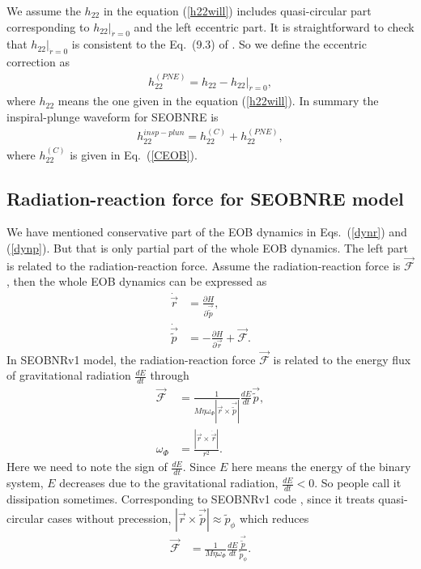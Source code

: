 \documentclass[prd,aps,a4paper,superscriptaddress,twocolumn,footinbib,showpacs]{revtex4}
\begin{document}
We assume the $h_{22}$ in the equation (\ref{h22will}) includes quasi-circular part corresponding to $h_{22}|_{\dot{r}=0}$ and the left eccentric part. It is straightforward to check that $h_{22}|_{\dot{r}=0}$ is consistent to the Eq.~(9.3) of \cite{Blanchet16}. So we define the eccentric correction as
\begin{align}
h_{22}^{(PNE)}=h_{22}-h_{22}|_{\dot{r}=0},\label{h22willelip}
\end{align}
where $h_{22}$ means the one given in the equation (\ref{h22will}). In summary the inspiral-plunge waveform for SEOBNRE is
\begin{align}
h_{22}^{insp-plun}=h_{22}^{(C)}+h_{22}^{(PNE)}, \label{Ewave}
\end{align}
where $h_{22}^{(C)}$ is given in Eq.~(\ref{CEOB}).

\subsection{Radiation-reaction force for SEOBNRE model}
We have mentioned conservative part of the EOB dynamics in Eqs.~(\ref{dynr}) and (\ref{dynp}). But that is only partial part of the whole EOB dynamics. The left part is related to the radiation-reaction force. Assume the radiation-reaction force is $\vec{\mathcal{F}}$, then the whole EOB dynamics can be expressed as
\begin{align}
\dot{\vec{r}}&=\frac{\partial H}{\partial\vec{\tilde{p}}},\label{fdynr}\\
\dot{\vec{\tilde{p}}}&=-\frac{\partial H}{\partial\vec{r}}+\vec{\mathcal{F}}.\label{fdynp}
\end{align}
In SEOBNRv1 model, the radiation-reaction force $\vec{\mathcal{F}}$ is related to the energy flux of gravitational radiation $\frac{dE}{dt}$ through \cite{PhysRevD.86.024011}
\begin{align}
\vec{\mathcal{F}}&=\frac{1}{M\eta\omega_\Phi|\vec{r}\times\vec{\tilde{p}}|}\frac{dE}{dt}\vec{\tilde{p}},\\
\omega_\Phi&=\frac{|\vec{r}\times\dot{\vec{r}}|}{r^2}.
\end{align}
Here we need to note the sign of $\frac{dE}{dt}$. Since $E$ here means the energy of the binary system, $E$ decreases due to the gravitational radiation, $\frac{dE}{dt}<0$. So people call it dissipation sometimes. Corresponding to SEOBNRv1 code \cite{SEOBNRv1code}, since it treats quasi-circular cases without precession, $|\vec{r}\times\vec{\tilde{p}}|\approx \tilde{p}_\phi$ which reduces
\begin{align}
\vec{\mathcal{F}}&=\frac{1}{M\eta\omega_\Phi}\frac{dE}{dt}\frac{\vec{\tilde{p}}}{\tilde{p}_\phi}.
\end{align}
\end{document}
